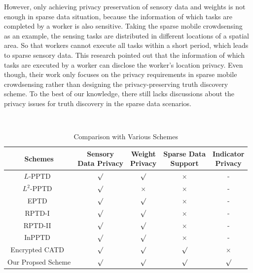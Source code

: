 \documentclass[conference]{IEEEtran}
\begin{document}
However, only achieving privacy preservation of sensory data and weights is not enough in sparse data situation, because the information of which tasks are completed by a worker is also sensitive.
Taking the sparse mobile crowdsensing~\cite{wang_sparse_2020} as an example, the sensing tasks are distributed in different locations of a spatial area.
So that workers cannot execute all tasks within a short period, which leads to sparse sensory data.
This research pointed out that the information of which tasks are executed by a worker can disclose the worker's location privacy.
Even though, their work only focuses on the privacy requirements in sparse mobile crowdsensing rather than designing the privacy-preserving truth discovery scheme.
To the best of our knowledge, there still lacks discussions about the privacy issues for truth discovery in the sparse data scenarios.

\begin{table}[htbp]
  \centering
  \caption{Comparison with Various Schemes}~\label{tab:security}
  \linespread{1.3}\selectfont
  \begin{adjustbox}{max width=0.46\textwidth}
  \begin{tabular}{ccccc}
    \hline
    \hline
    Schemes & \makecell[c]{Sensory \\ Data Privacy} & \makecell[c]{Weight \\ Privacy} & \makecell[c]{Sparse Data \\ Support} & \makecell[c]{Indicator \\ Privacy} \\
    \hline
    $L$-PPTD~\cite{miao_lightweight_2017} & $\surd$ & $\surd$ & $\times$ & - \\
    $L^2$-PPTD~\cite{miao_lightweight_2017} & $\surd$ & $\times$ & $\times$ & - \\
    EPTD~\cite{xu_efficient_2019} & $\surd$ & $\surd$ & $\times$ & - \\
    RPTD-I~\cite{zhang_reliable_2019} & $\surd$ & $\surd$ & $\times$ & - \\
    RPTD-II~\cite{zhang_reliable_2019} & $\surd$ & $\surd$ & $\times$ & - \\
    InPPTD~\cite{xue_inpptd_2020} & $\surd$ & $\surd$ & $\times$ & - \\
    Encrypted CATD~\cite{zheng_learning_2018} & $\surd$ & $\surd$ & $\surd$ & $\times$ \\
    Our Propsed Scheme & $\surd$ & $\surd$ & $\surd$ & $\surd$ \\
    \hline
    \hline
  \end{tabular}  
  \end{adjustbox}
\end{table}
\end{document}
